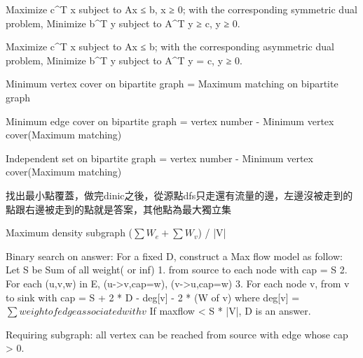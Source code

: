 Maximize c^T x subject to Ax ≤ b, x ≥ 0;
with the corresponding symmetric dual problem,
Minimize b^T y subject to A^T y ≥ c, y ≥ 0.

Maximize c^T x subject to Ax ≤ b;
with the corresponding asymmetric dual problem,
Minimize b^T y subject to A^T y = c, y ≥ 0. 

Minimum vertex cover on bipartite graph =
Maximum matching on bipartite graph

Minimum edge cover on bipartite graph =
vertex number - Minimum vertex cover(Maximum matching)

Independent set on bipartite graph =
vertex number - Minimum vertex cover(Maximum matching)

找出最小點覆蓋，做完dinic之後，從源點dfs只走還有流量的邊，左邊沒被走到的點跟右邊被走到的點就是答案，其他點為最大獨立集

Maximum density subgraph ($\sum W_e+\sum W_v$) / |V|

Binary search on answer:
For a fixed D, construct a Max flow model as follow:
Let S be Sum of all weight( or inf)
1. from source to each node with cap = S
2. For each (u,v,w) in E, (u->v,cap=w), (v->u,cap=w)
3. For each node v, from v to sink with cap = S + 2 * D - deg[v] - 2 * (W of v)
where deg[v] = $\sum weight of edge associated with v$
If maxflow < S * |V|, D is an answer.

Requiring subgraph: all vertex can be reached from source with
edge whose cap > 0.
